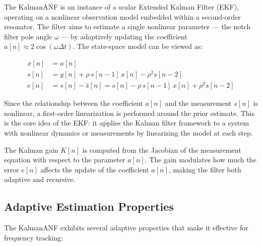 \documentclass{article}
\begin{document}
The KalmanANF is an instance of a scalar Extended Kalman Filter (EKF), operating on a nonlinear observation model embedded within a second-order resonator. The filter aims to estimate a single nonlinear parameter — the notch filter pole angle \( \omega \) — by adaptively updating the coefficient \( a[n] \approx 2 \cos(\omega \Delta t) \). The state-space model can be viewed as:

\begin{align*}
x[n] &= a[n] \\
s[n] &= y[n] + \rho\,s[n-1]\,x[n] - \rho^2 s[n-2] \\
e[n] &= s[n] - \hat{s}[n] = s[n] - \rho\,s[n-1]\,x[n] + \rho^2 s[n-2]
\end{align*}

Since the relationship between the coefficient \( a[n] \) and the measurement \( s[n] \) is nonlinear, a first-order linearization is performed around the prior estimate. This is the core idea of the EKF: it applies the Kalman filter framework to a system with nonlinear dynamics or measurements by linearizing the model at each step.

The Kalman gain \( K[n] \) is computed from the Jacobian of the measurement equation with respect to the parameter \( a[n] \). The gain modulates how much the error \( e[n] \) affects the update of the coefficient \( a[n] \), making the filter both adaptive and recursive.

\subsection{Adaptive Estimation Properties}

The KalmanANF exhibits several adaptive properties that make it effective for frequency tracking:
\end{document}
